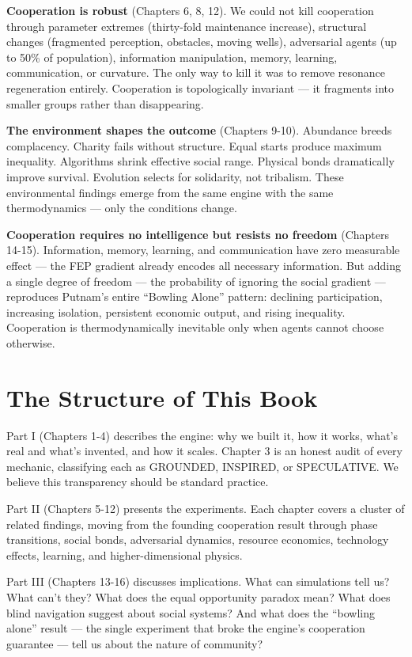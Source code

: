 \textbf{Cooperation is robust} (Chapters 6, 8, 12). We could not kill cooperation through parameter extremes (thirty-fold maintenance increase), structural changes (fragmented perception, obstacles, moving wells), adversarial agents (up to 50\% of population), information manipulation, memory, learning, communication, or curvature. The only way to kill it was to remove resonance regeneration entirely. Cooperation is topologically invariant --- it fragments into smaller groups rather than disappearing.

\textbf{The environment shapes the outcome} (Chapters 9-10). Abundance breeds complacency. Charity fails without structure. Equal starts produce maximum inequality. Algorithms shrink effective social range. Physical bonds dramatically improve survival. Evolution selects for solidarity, not tribalism. These environmental findings emerge from the same engine with the same thermodynamics --- only the conditions change.

\textbf{Cooperation requires no intelligence but resists no freedom} (Chapters 14-15). Information, memory, learning, and communication have zero measurable effect --- the FEP gradient already encodes all necessary information. But adding a single degree of freedom --- the probability of ignoring the social gradient --- reproduces Putnam's entire ``Bowling Alone'' pattern: declining participation, increasing isolation, persistent economic output, and rising inequality. Cooperation is thermodynamically inevitable only when agents cannot choose otherwise.

\section{The Structure of This Book}\label{the-structure-of-this-book}

Part I (Chapters 1-4) describes the engine: why we built it, how it works, what's real and what's invented, and how it scales. Chapter 3 is an honest audit of every mechanic, classifying each as GROUNDED, INSPIRED, or SPECULATIVE. We believe this transparency should be standard practice.

Part II (Chapters 5-12) presents the experiments. Each chapter covers a cluster of related findings, moving from the founding cooperation result through phase transitions, social bonds, adversarial dynamics, resource economics, technology effects, learning, and higher-dimensional physics.

Part III (Chapters 13-16) discusses implications. What can simulations tell us? What can't they? What does the equal opportunity paradox mean? What does blind navigation suggest about social systems? And what does the ``bowling alone'' result --- the single experiment that broke the engine's cooperation guarantee --- tell us about the nature of community?

